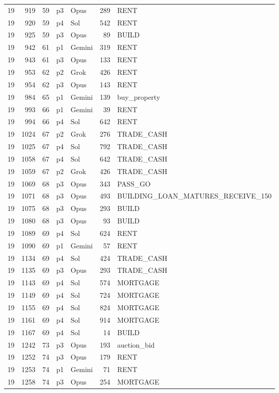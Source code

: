 \begin{longtable}{r r r l l r L{2.2in}}
19 & 919 & 59 & p3 & Opus & 289 & RENT \\
19 & 920 & 59 & p4 & Sol & 542 & RENT \\
19 & 925 & 59 & p3 & Opus & 89 & BUILD \\
19 & 942 & 61 & p1 & Gemini & 319 & RENT \\
19 & 943 & 61 & p3 & Opus & 133 & RENT \\
19 & 953 & 62 & p2 & Grok & 426 & RENT \\
19 & 954 & 62 & p3 & Opus & 143 & RENT \\
19 & 984 & 65 & p1 & Gemini & 139 & buy\_property \\
19 & 993 & 66 & p1 & Gemini & 39 & RENT \\
19 & 994 & 66 & p4 & Sol & 642 & RENT \\
19 & 1024 & 67 & p2 & Grok & 276 & TRADE\_CASH \\
19 & 1025 & 67 & p4 & Sol & 792 & TRADE\_CASH \\
19 & 1058 & 67 & p4 & Sol & 642 & TRADE\_CASH \\
19 & 1059 & 67 & p2 & Grok & 426 & TRADE\_CASH \\
19 & 1069 & 68 & p3 & Opus & 343 & PASS\_GO \\
19 & 1071 & 68 & p3 & Opus & 493 & BUILDING\_LOAN\_MATURES\_RECEIVE\_150 \\
19 & 1075 & 68 & p3 & Opus & 293 & BUILD \\
19 & 1080 & 68 & p3 & Opus & 93 & BUILD \\
19 & 1089 & 69 & p4 & Sol & 624 & RENT \\
19 & 1090 & 69 & p1 & Gemini & 57 & RENT \\
19 & 1134 & 69 & p4 & Sol & 424 & TRADE\_CASH \\
19 & 1135 & 69 & p3 & Opus & 293 & TRADE\_CASH \\
19 & 1143 & 69 & p4 & Sol & 574 & MORTGAGE \\
19 & 1149 & 69 & p4 & Sol & 724 & MORTGAGE \\
19 & 1155 & 69 & p4 & Sol & 824 & MORTGAGE \\
19 & 1161 & 69 & p4 & Sol & 914 & MORTGAGE \\
19 & 1167 & 69 & p4 & Sol & 14 & BUILD \\
19 & 1242 & 73 & p3 & Opus & 193 & auction\_bid \\
19 & 1252 & 74 & p3 & Opus & 179 & RENT \\
19 & 1253 & 74 & p1 & Gemini & 71 & RENT \\
19 & 1258 & 74 & p3 & Opus & 254 & MORTGAGE \\

\end{longtable}
